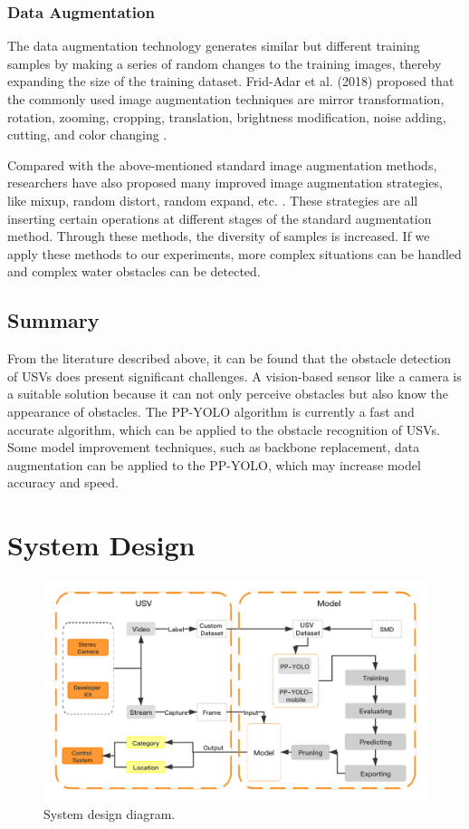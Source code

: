 \documentclass[journal,article,submit,moreauthors,pdftex]{Definitions/mdpi}
\begin{document}
\subsubsection{Data Augmentation}

The data augmentation technology generates similar but different training samples by making a series of random changes to the training images, thereby expanding the size of the training dataset. Frid-Adar et al. (2018) proposed that the commonly used image augmentation techniques are mirror transformation, rotation, zooming, cropping, translation, brightness modification, noise adding, cutting, and color changing \cite{frid2018gan}.

Compared with the above-mentioned standard image augmentation methods, researchers have also proposed many improved image augmentation strategies, like mixup, random distort, random expand, etc. \cite{cubuk2018autoaugment, devries2017improved}. These strategies are all inserting certain operations at different stages of the standard augmentation method. Through these methods, the diversity of samples is increased. If we apply these methods to our experiments, more complex situations can be handled and complex water obstacles can be detected.

\subsection{Summary}

From the literature described above, it can be found that the obstacle detection of USVs does present significant challenges. A vision-based sensor like a camera is a suitable solution because it can not only perceive obstacles but also know the appearance of obstacles. The PP-YOLO algorithm is currently a fast and accurate algorithm, which can be applied to the obstacle recognition of USVs. Some model improvement techniques, such as 
backbone replacement, data augmentation can be applied to the PP-YOLO, which may increase model accuracy and speed.

\section{System Design}

\begin{figure}[htbp]
\centering
\includegraphics[width=1\columnwidth]{images/design.png}
\caption{System design diagram.}
\label{fig:system architecture}
\end{figure}
\end{document}
